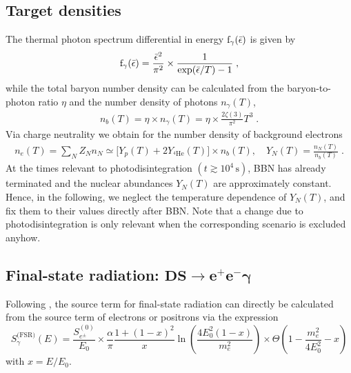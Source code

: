 \documentclass[11pt,a4paper]{article}
\newcommand{\fpdi}{\mathrm{f}}
\newcommand{\eq}[1]{#1}
\newcommand{\eqsp}{\;}
\begin{document}
\subsection*{Target densities}
The thermal photon spectrum differential in energy $\fpdi_\gamma(\be)$ is given by
\begin{align}
\fpdi_\gamma(\be) = \frac{\be^2}{\pi^2} \times \frac{1}{\exp(\be/T) - 1}\eqsp,
\end{align}
while the total baryon number density can be calculated from the baryon-to-photon ratio $\eta$ and the number density of photons $n_\gamma(T)$,
\begin{align}
n_b(T) = \eta \times n_\gamma(T) = \eta \times \frac{2\zeta(3)}{\pi^2} T^3 \eqsp.
\end{align}
Via charge neutrality we obtain for the number density of background electrons
\begin{align}
\eq{n}_e(T) = \sum_N Z_Nn_N \simeq \big[Y_{p}(T) + 2 Y_{{}^4\text{He}}(T)\big]\times n_b(T),\quad Y_N(T) = \frac{n_N(T)}{n_b(T)} \eqsp.
\end{align}
At the times relevant to photodisintegration $(t \gtrsim 10^4\,\text{s})$, BBN has already terminated and the nuclear abundances $Y_N(T)$ are approximately constant. Hence, in the following, we neglect the temperature dependence of $Y_N(T)$, and fix them to their values directly after BBN. Note that a change due to photodisintegration is only relevant when the corresponding scenario is excluded anyhow.

\subsection*{Final-state radiation: $\boldsymbol{\text{DS} \rightarrow e^+ e^- \gamma}$}

Following \cite{Forestell:2018txr}, the source term for final-state radiation can directly be calculated from the source term of electrons or positrons via the expression \cite{Mardon:2009rc,Birkedal:2005ep}
\begin{equation}
S_\gamma^\text{(FSR)}(E) = \frac{S_{e^\pm}^{(0)}}{E_0} \times \frac{\alpha}{\pi} \frac{1+(1-x)^2}{x}\ln\left( \frac{4E_0^2(1-x)}{m_e^2} \right) \times \Theta\left( 1 - \frac{m_e^2}{4E_0^2} - x \right)
\label{eq:SFSR}
\end{equation}
with $x=E/E_0$.
\end{document}
